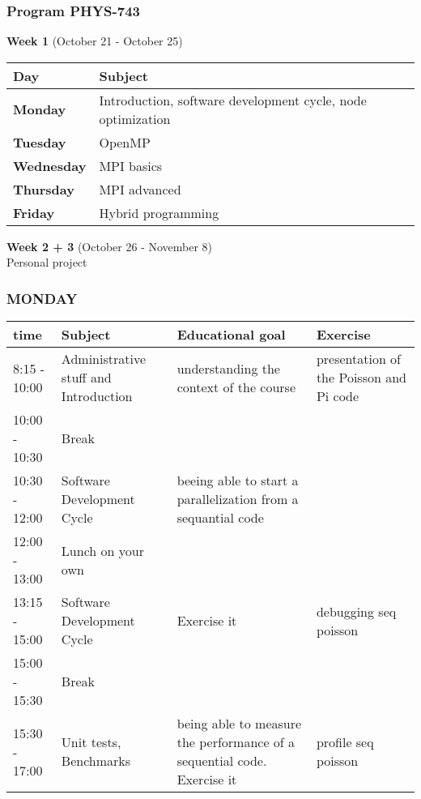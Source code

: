 
%
%

\begin{frame}[containsverbatim]
\frametitle{Program PHYS-743 }
\begin{center}
\textbf{Week 1} (October 21 - October 25)
\end{center}
\scriptsize
\begin{tabular}{| m{2cm} | m{8cm} | }
\hline
 \textbf{Day} & \textbf{Subject}  \\
\hline
\hline
\textbf{Monday}  & Introduction, software development cycle, node optimization\\
\hline
\textbf{Tuesday} & OpenMP \\
\hline
\textbf{Wednesday} & MPI basics\\
\hline
\textbf{Thursday} & MPI advanced\\
\hline
\textbf{Friday} & Hybrid programming\\
\hline
\end{tabular}

\vspace{0.3in}

\normalsize
\begin{center}
\textbf{Week 2 + 3} (October 26 - November 8)
\\
Personal project
\end{center}

\end{frame}



\begin{frame}[containsverbatim]
\frametitle{MONDAY}
\scriptsize
\begin{tabular}{| l | m{2.5cm} | m{2.5cm} | m{2.5cm} | }
\hline
 \textbf{time} & \textbf{Subject} & \textbf{Educational goal}& \textbf{Exercise} \\
\hline
\hline
8:15 - 10:00 & Administrative stuff and Introduction & understanding the context of the course & presentation of the Poisson and Pi code\\
\hline
10:00 - 10:30 & Break & & \\
\hline
10:30 - 12:00 & Software Development Cycle & beeing able to start a parallelization from a sequantial code &  \\
\hline
12:00 - 13:00 & Lunch on your own & & \\
\hline
13:15 - 15:00 & Software Development Cycle & Exercise it & debugging seq poisson \\
\hline
15:00 - 15:30 & Break &  & \\
\hline
15:30 - 17:00 & Unit tests, Benchmarks & being able to measure the performance of a sequential code. Exercise it & profile seq poisson\\
\hline
\end{tabular}
\end{frame}


